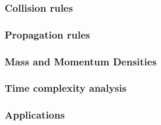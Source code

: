 \documentclass[a4paper,10pt]{article}
\begin{document}
\subsubsection{Collision rules}
\subsubsection{Propagation rules}
\subsubsection{Mass and Momentum Densities}
\subsubsection{Time complexity analysis}
\subsubsection{Applications}
\end{document}
